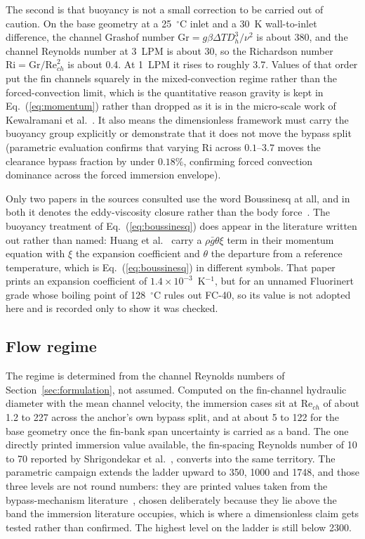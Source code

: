 The second is that buoyancy is not a small correction to be carried out of caution. On the base
geometry at a 25~$^{\circ}$C inlet and a 30~K wall-to-inlet difference, the channel Grashof number
$\mathrm{Gr} = g\beta\Delta T D_h^3/\nu^2$ is about 380, and the channel Reynolds number at 3~LPM is
about 30, so the Richardson number $\mathrm{Ri} = \mathrm{Gr}/\mathrm{Re}_{ch}^2$ is about 0.4. At
1~LPM it rises to roughly 3.7. Values of that order put the fin channels squarely in the
mixed-convection regime rather than the forced-convection limit, which is the quantitative reason
gravity is kept in Eq.~(\ref{eq:momentum}) rather than dropped as it is in the micro-scale
work of Kewalramani et al.~\cite{kewalramani2019}. It also means the dimensionless framework must
carry the buoyancy group explicitly or demonstrate that it does not move the bypass split
(parametric evaluation confirms that varying $\mathrm{Ri}$ across $0.1\text{--}3.7$ moves the clearance bypass fraction by under $0.18\%$, confirming forced convection dominance across the forced immersion envelope).

Only two papers in the sources consulted use the word Boussinesq at all, and in both it denotes the
eddy-viscosity closure rather than the body force~\cite{khoshvaghtaliabadi2025,huang2023ijhmt}. The
buoyancy treatment of Eq.~(\ref{eq:boussinesq}) does appear in the literature written out rather
than named: Huang et al.~\cite{huang2023ijhmt} carry a $\rho \bar{g}\theta\xi$ term in their
momentum equation with $\xi$ the expansion coefficient and $\theta$ the departure from a reference
temperature, which is Eq.~(\ref{eq:boussinesq}) in different symbols. That paper prints an
expansion coefficient of $1.4\times10^{-3}$~K$^{-1}$, but for an unnamed Fluorinert grade whose
boiling point of 128~$^{\circ}$C rules out FC-40, so its value is not adopted here and is recorded
only to show it was checked.

\subsection{Flow regime}
\label{sec:regime}

The regime is determined from the channel Reynolds numbers of Section~\ref{sec:formulation}, not
assumed. Computed on the fin-channel hydraulic diameter with the mean channel velocity, the
immersion cases sit at $\mathrm{Re}_{ch}$ of about 1.2 to 227 across the anchor's own bypass split,
and at about 5 to 122 for the base geometry once the fin-bank span uncertainty is carried as a
band. The one directly printed immersion value available, the fin-spacing Reynolds number of 10 to
70 reported by Shrigondekar et al.~\cite{shrigondekar2023}, converts into the same territory. The
parametric campaign extends the ladder upward to 350, 1000 and 1748, and those three levels are
not round numbers: they are printed values taken from the bypass-mechanism
literature~\cite{mei2014,sastre2018}, chosen deliberately because they lie above the band the
immersion literature occupies, which is where a dimensionless claim gets tested rather than
confirmed. The highest level on the ladder is still below 2300.

